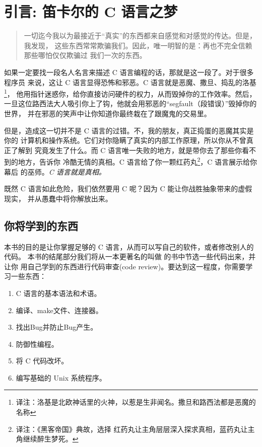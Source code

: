 \chapter*{引言: 笛卡尔的 C 语言之梦}

\begin{quotation}

一切迄今我以为最接近于“真实”的东西都来自感觉和对感觉的传达。但是，我发现，
这些东西常常欺骗我们。因此，唯一明智的是：再也不完全信赖那些哪怕仅仅欺骗过
我们一次的东西。

\end{quotation}

如果一定要找一段名人名言来描述 C 语言编程的话，那就是这一段了。对于很多程序员
来说，这让 C 语言显得恐怖和邪恶。C 语言就是恶魔、撒旦、捣乱的洛基\footnote
{译注：洛基是北欧神话里的火神，以惹是生非闻名。撒旦和路西法都是恶魔的名称}，
他用指针迷惑你，给你直接访问硬件的权力，从而毁掉你的工作效率。然后，
一旦这位路西法大人吸引你上了钩，他就会用邪恶的“segfault（段错误）”毁掉你的世界，
并在邪恶的笑声中让你知道你最终栽在了跟魔鬼的交易里。

但是，造成这一切并不是 C 语言的过错。不，我的朋友，真正捣蛋的恶魔其实是你的
计算机和操作系统。它们对你隐瞒了真实的内部工作原理，所以你从不曾真正了解到
究竟发生了什么。而 C 语言唯一失败的地方，就是带你去了那些你看不到的地方，告诉你
冷酷无情的真相。C 语言给了你一颗红药丸\footnote{译注：《黑客帝国》典故，选择
红药丸让主角层层深入探求真相，蓝药丸让主角继续醉生梦死。}，C 语言展示给你幕后
的巫师。\emph{C 语言就是真相。}

既然 C 语言如此危险，我们依然要用 C 呢？因为 C 能让你战胜抽象带来的虚假现实，
并从愚蠢中将你解放出来。

\section*{你将学到的东西}

本书的目的是让你掌握足够的 C 语言，从而可以写自己的软件，或者修改别人的代码。
本书的结尾部分我们将从一本更著名的叫做 \krc 的书中节选一些代码出来，并让你
用自己学到的东西进行代码审查(code review)。要达到这一程度，你需要学习一些东西：

\begin{enumerate}
\item C 语言的基本语法和术语。
\item 编译、make文件、连接器。
\item 找出Bug并防止Bug产生。
\item 防御性编程。
\item 将 C 代码改坏。
\item 编写基础的 Unix 系统程序。
\end{enumerate}

